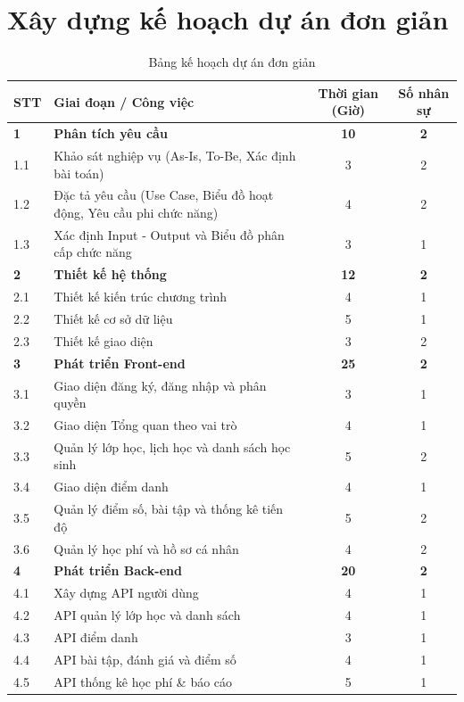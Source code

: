 \section{Xây dựng kế hoạch dự án đơn giản}
\begin{table}[h]
\centering
\caption{Bảng kế hoạch dự án đơn giản}
\begin{tabularx}{\textwidth}{l X c c}
\toprule
\textbf{STT} & \textbf{Giai đoạn / Công việc} & \textbf{Thời gian (Giờ)} & \textbf{Số nhân sự} \\
\midrule
\textbf{1} & \textbf{Phân tích yêu cầu} & \textbf{10} & \textbf{2} \\
1.1 & Khảo sát nghiệp vụ (As-Is, To-Be, Xác định bài toán) & 3 & 2 \\
1.2 & Đặc tả yêu cầu (Use Case, Biểu đồ hoạt động, Yêu cầu phi chức năng) & 4 & 2 \\
1.3 & Xác định Input - Output và Biểu đồ phân cấp chức năng & 3 & 1 \\
\addlinespace
\textbf{2} & \textbf{Thiết kế hệ thống} & \textbf{12} & \textbf{2} \\
2.1 & Thiết kế kiến trúc chương trình & 4 & 1 \\
2.2 & Thiết kế cơ sở dữ liệu & 5 & 1 \\
2.3 & Thiết kế giao diện & 3 & 2 \\
\addlinespace
\textbf{3} & \textbf{Phát triển Front-end} & \textbf{25} & \textbf{2} \\
3.1 & Giao diện đăng ký, đăng nhập và phân quyền & 3 & 1 \\
3.2 & Giao diện Tổng quan theo vai trò & 4 & 1 \\
3.3 & Quản lý lớp học, lịch học và danh sách học sinh & 5 & 2 \\
3.4 & Giao diện điểm danh & 4 & 1 \\
3.5 & Quản lý điểm số, bài tập và thống kê tiến độ & 5 & 2 \\
3.6 & Quản lý học phí và hồ sơ cá nhân & 4 & 2 \\
\addlinespace
\textbf{4} & \textbf{Phát triển Back-end} & \textbf{20} & \textbf{2} \\
4.1 & Xây dựng API người dùng & 4 & 1 \\
4.2 & API quản lý lớp học và danh sách & 4 & 1 \\
4.3 & API điểm danh & 3 & 1 \\
4.4 & API bài tập, đánh giá và điểm số & 4 & 1 \\
4.5 & API thống kê học phí \& báo cáo & 5 & 1 \\

\end{tabularx}
\end{table}
